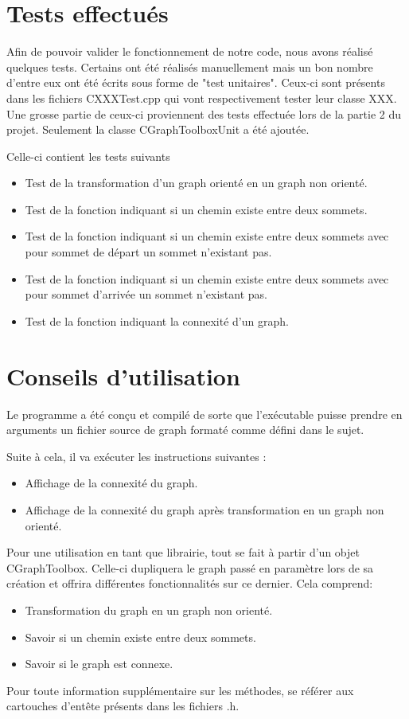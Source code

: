 	\chapter{Tests effectués}
		Afin de pouvoir valider le fonctionnement de notre code, nous avons réalisé quelques tests. Certains ont été réalisés manuellement mais un bon nombre d'entre eux ont été écrits sous forme de "test unitaires". Ceux-ci sont présents dans les fichiers CXXXTest.cpp qui vont respectivement tester leur classe XXX. Une grosse partie de ceux-ci proviennent des tests effectuée lors de la partie 2 du projet. Seulement la classe CGraphToolboxUnit a été ajoutée.
		
		Celle-ci contient les tests suivants
		\begin{itemize}
			\item Test de la transformation d'un graph orienté en un graph non orienté.
			\item Test de la fonction indiquant si un chemin existe entre deux sommets.
			\item Test de la fonction indiquant si un chemin existe entre deux sommets avec pour sommet de départ un sommet n'existant pas.
			\item Test de la fonction indiquant si un chemin existe entre deux sommets avec pour sommet d'arrivée un sommet n'existant pas.
			\item Test de la fonction indiquant la connexité d'un graph.
		\end{itemize}
			
	\chapter{Conseils d'utilisation}
	Le programme a été conçu et compilé de sorte que l'exécutable puisse prendre en arguments un fichier source de graph formaté comme défini dans le sujet.
	
	Suite à cela, il va exécuter les instructions suivantes :
	\begin{itemize}
		\item Affichage de la connexité du graph.
		\item Affichage de la connexité du graph après transformation en un graph non orienté. \\
	\end{itemize}
	Pour une utilisation en tant que librairie, tout se fait à partir d'un objet CGraphToolbox. Celle-ci dupliquera le graph passé en paramètre lors de sa création et offrira différentes fonctionnalités sur ce dernier. Cela comprend:
	\begin{itemize}
		\item Transformation du graph en un graph non orienté.
		\item Savoir si un chemin existe entre deux sommets.
		\item Savoir si le graph est connexe.\\
	\end{itemize}
	
	Pour toute information supplémentaire sur les méthodes, se référer aux cartouches d'entête présents dans les fichiers .h.

